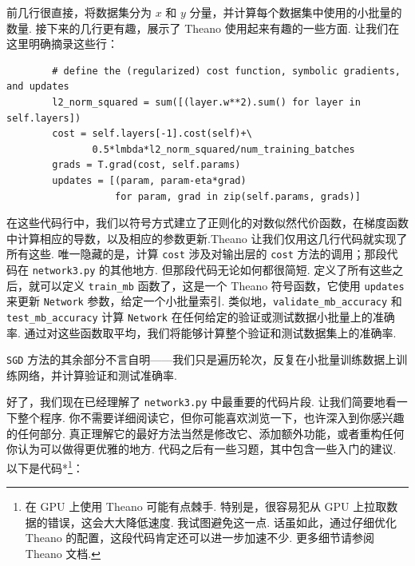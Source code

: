 前几行很直接，将数据集分为 $x$ 和 $y$ 分量，并计算每个数据集中使用的小批量的数量. 接下来的几行更有趣，展示了 Theano 使用起来有趣的一些方面. 让我们在这里明确摘录这些行：
\begin{lstlisting}
        # define the (regularized) cost function, symbolic gradients, and updates
        l2_norm_squared = sum([(layer.w**2).sum() for layer in self.layers])
        cost = self.layers[-1].cost(self)+\
               0.5*lmbda*l2_norm_squared/num_training_batches
        grads = T.grad(cost, self.params)
        updates = [(param, param-eta*grad)
                   for param, grad in zip(self.params, grads)]

\end{lstlisting}

在这些代码行中，我们以符号方式建立了正则化的对数似然代价函数，在梯度函数中计算相应的导数，以及相应的参数更新.Theano 让我们仅用这几行代码就实现了所有这些. 唯一隐藏的是，计算 \texttt{cost} 涉及对输出层的 \texttt{cost} 方法的调用；那段代码在 \texttt{network3.py} 的其他地方. 但那段代码无论如何都很简短. 定义了所有这些之后，就可以定义 \texttt{train\_\allowbreak{}mb} 函数了，这是一个 Theano 符号函数，它使用 \texttt{updates} 来更新 \texttt{Network} 参数，给定一个小批量索引. 类似地，\texttt{validate\_\allowbreak{}mb\_\allowbreak{}accuracy} 和 \texttt{test\_\allowbreak{}mb\_\allowbreak{}accuracy} 计算 \texttt{Network} 在任何给定的验证或测试数据小批量上的准确率. 通过对这些函数取平均，我们将能够计算整个验证和测试数据集上的准确率.

\texttt{SGD} 方法的其余部分不言自明——我们只是遍历轮次，反复在小批量训练数据上训练网络，并计算验证和测试准确率.

好了，我们现在已经理解了 \texttt{network3.py} 中最重要的代码片段. 让我们简要地看一下整个程序. 你不需要详细阅读它，但你可能喜欢浏览一下，也许深入到你感兴趣的任何部分. 真正理解它的最好方法当然是修改它、添加额外功能，或者重构任何你认为可以做得更优雅的地方. 代码之后有一些习题，其中包含一些入门的建议. 以下是代码*\footnote{在 GPU 上使用 Theano 可能有点棘手. 特别是，很容易犯从 GPU 上拉取数据的错误，这会大大降低速度. 我试图避免这一点. 话虽如此，通过仔细优化 Theano 的配置，这段代码肯定还可以进一步加速不少. 更多细节请参阅 Theano 文档.}：

